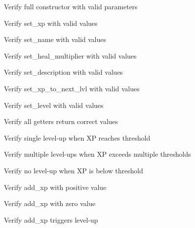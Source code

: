 \begin{DoxyRefList}
\label{test__test000072}%
%
Verify full constructor with valid parameters  



\label{test__test000077}%
%
Verify set\+\_\+xp with valid values  



\label{test__test000079}%
%
Verify set\+\_\+name with valid values  



\label{test__test000081}%
%
Verify set\+\_\+heal\+\_\+multiplier with valid values  



\label{test__test000083}%
%
Verify set\+\_\+description with valid values  



\label{test__test000085}%
%
Verify set\+\_\+xp\+\_\+to\+\_\+next\+\_\+lvl with valid values  



\label{test__test000087}%
%
Verify set\+\_\+level with valid values  



\label{test__test000089}%
%
Verify all getters return correct values  



\label{test__test000090}%
%
Verify single level-\/up when XP reaches threshold  



\label{test__test000091}%
%
Verify multiple level-\/ups when XP exceeds multiple thresholds  



\label{test__test000092}%
%
Verify no level-\/up when XP is below threshold  



\label{test__test000093}%
%
Verify add\+\_\+xp with positive value  



\label{test__test000094}%
%
Verify add\+\_\+xp with zero value  



\label{test__test000096}%
%
Verify add\+\_\+xp triggers level-\/up  




\end{DoxyRefList}
